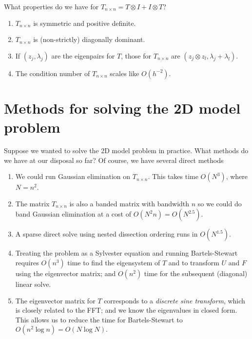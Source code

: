 \documentclass[12pt, leqno]{article} %
\begin{document}
What properties do we have for $T_{n \times n} = T \otimes I + I
\otimes T$?
\begin{enumerate}
\item
  $T_{n \times n}$ is symmetric and positive definite.
\item
  $T_{n \times n}$ is (non-strictly) diagonally dominant.
\item
  If $(z_j, \lambda_j)$ are the eigenpairs for $T$, those for
  $T_{n \times n}$ are $(z_j \otimes z_l, \lambda_j+\lambda_l)$.
\item
  The condition number of $T_{n \times n}$ scales like $O(h^{-2})$.
\end{enumerate}

\section{Methods for solving the 2D model problem}

Suppose we wanted to solve the 2D model problem in practice.  What
methods do we have at our disposal so far?  Of course, we have several
direct methods
\begin{enumerate}
\item
  We could run Gaussian elimination on $T_{n \times n}$.  This takes
  time $O(N^3)$, where $N = n^2$.
\item
  The matrix $T_{n \times n}$ is also a banded matrix with bandwidth
  $n$ so we could do band Gaussian elimination at a cost of
  $O(N^2 n) = O(N^{2.5})$.
\item
  A sparse direct solve using nested dissection ordering runs in
  $O(N^{1.5})$.
\item
  Treating the problem as a Sylvester equation and running
  Bartels-Stewart requires $O(n^3)$ time to find the eigensystem of
  $T$ and to transform $U$ and $F$ using the eigenvector matrix;
  and $O(n^2)$ time for the subsequent (diagonal) linear solve.
\item
  The eigenvector matrix for $T$ corresponds to a {\em discrete sine
    transform}, which is closely related to the FFT; and we know the
  eigenvalues in closed form.  This allows us to reduce the time for
  Bartels-Stewart to $O(n^2 \log n) = O(N \log N)$.
\end{enumerate}
\end{document}
